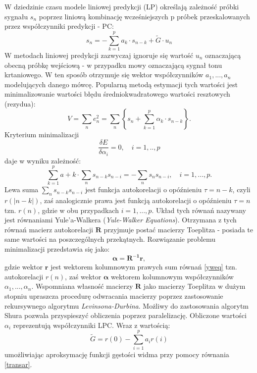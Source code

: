 W dziedzinie czasu modele liniowej predykcji (LP) określają zależność próbki sygnału $s_n$ poprzez liniową kombinację wcześniejszych p próbek przeskalowanych przez współczynniki predykcji - PC:
\begin{equation}
  s_n = - \sum_{k=1}^{p}a_k\cdot s_{n-k}+\tilde{G}\cdot u_n
\end{equation}
W metodach liniowej predykcji zazwyczaj ignoruje się wartość $u_n$ oznaczającą obecną próbkę wejściową - w przypadku mowy oznaczającą sygnał tonu krtaniowego. W ten sposób otrzymuje się wektor współczynników $a_1,...,a_n$ modelujących danego mówcę. Popularną metodą estymacji tych wartości jest minimalizowanie wartości błędu średniokwadratowego wartości resztowych (rezydua):
\begin{equation}
  V = \sum_{n} e_n^2 = \sum_n \left\{ s_n + \sum_{k=1}^p \alpha_k \cdot s_{n-k} \right\}.
\end{equation}
Kryterium minimalizacji
\begin{equation}
  \frac{\delta E}{\delta \alpha_i} = 0, \quad i=1,..,p
\end{equation}
daje w wyniku zależność:
\begin{equation}
  \label{yweq}
  \sum_{k=1}^{p} a+k \cdot \sum_n s_{n-k} s_{n-i} = - \sum_n s_n s_{n-i}, \quad  i=1,...,p.
\end{equation}
Lewa suma $ \sum_n s_{n-k} s_{n-i} $ jest funkcja autokorelacji o opóźnieniu $ \tau = n-k $, czyli $ r(|n-k|) $, zaś analogicznie prawa jest funkcją autokorelacji o opóźnieniu $ \tau = n $ tzn. $ r(n)$, gdzie w obu przypadkach $i=1,...,p$.
Układ tych równań nazywany jest równaniami Yule'a-Walkera (\textit{Yule-Walker Equations}). Otrzymana z tych równań macierz autokorelacji $ \bm{R} $ przyjmuje postać macierzy Toeplitza - posiada te same wartości na poszczególnych przekątnych. Rozwiązanie problemu minimalizacji przedstawia się jako:
\begin{equation}
  \bm{\alpha} = \bm{R^{-1}} \bm{r},
\end{equation}
gdzie wektor $ \bm{r}$ jest wektorem kolumnowym prawych sum równań \ref{yweq} tzn. autokorelacji $ r(n)$, zaś wektor $ \bm{\alpha} $ wektorem kolumnowym współczynników $\alpha_1,...,\alpha_n$. Wspomniana własność macierzy $\bm{R}$ jako macierzy Toeplitza w dużym stopniu upraszcza procedurę odwracania macierzy poprzez zastosowanie rekursywnego algorytmu \textit{Levinsona-Durbina}\cite{durbin}. Możliwy do zastosowania algorytm Shura\cite{shur} pozwala przyspieszyć obliczenia poprzez paralelizację. Obliczone wartości $\alpha_i$ reprezentują współczynniki LPC. Wraz z wartością:
\begin{equation}
  \tilde{G} = r(0) - \sum_{i=1}^{p} a_i r(i)
\end{equation}
umożliwiając aproksymację funkcji gęstości widma przy pomocy równania \ref{transar}.

